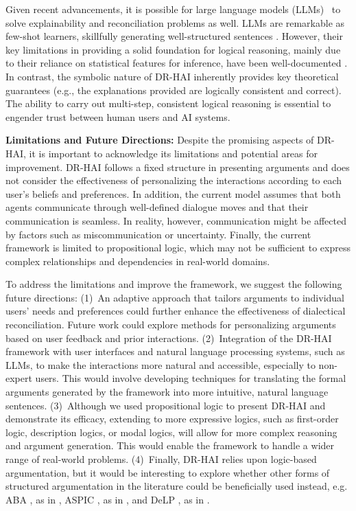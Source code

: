 \documentclass[letterpaper]{article} %
\begin{document}
Given recent advancements, it is possible for large language models (LLMs)~\cite{brown2020language} to solve explainability and reconciliation problems as well. LLMs are remarkable as few-shot learners, skillfully generating well-structured sentences \cite{brown2020language,lu2022pretrained}. However, their key limitations in providing a solid foundation for logical reasoning, mainly due to their reliance on statistical features for inference, have been well-documented \cite{rae2021scaling,creswellselection}. In contrast, the symbolic nature of DR-HAI inherently provides key theoretical guarantees (e.g., the explanations provided are logically consistent and correct). The ability to carry out multi-step, consistent logical reasoning is essential to engender trust between human users and AI systems. %




  \smallskip 
 \noindent \textbf{Limitations and Future Directions: } Despite the promising aspects of DR-HAI, it is important to acknowledge its limitations and potential areas for improvement. 
 DR-HAI follows a fixed structure in presenting arguments and does not consider the effectiveness of personalizing the interactions according to each user's beliefs and preferences. In addition, the current model assumes that both agents communicate through well-defined dialogue moves and that their communication is seamless. In reality, however, communication might be affected by factors such as miscommunication or uncertainty. Finally, the current framework is limited to propositional logic, which may not be sufficient to express complex relationships and dependencies in real-world domains.
 
 To address the limitations and improve the framework, we suggest the following future directions: (1)~An adaptive approach that tailors arguments to individual users' needs and preferences could further enhance the effectiveness of dialectical reconciliation. Future work could explore methods for personalizing arguments based on user feedback and prior interactions. 
 (2)~Integration of the DR-HAI framework with user interfaces and natural language processing systems, such as LLMs, to make the interactions more natural and accessible, especially to non-expert users. This would involve developing techniques for translating the formal arguments generated by the framework into more intuitive, natural language sentences.
 (3)~Although we used propositional logic to present DR-HAI and demonstrate its efficacy, extending to more expressive logics, such as first-order logic,
 description logics, or modal logics, will allow for more complex reasoning and argument generation. This would enable the framework to handle a wider range of real-world problems.
 (4)~Finally, DR-HAI relies upon logic-based argumentation, but it would be interesting to explore whether other forms 
 of structured argumentation in the literature \cite{Arg&CompStruct} could be beneficially used instead, e.g.  ABA \cite{toni2014tutorial}, as in \cite{fan2018on}, ASPIC \cite{modgil2014aspic+}, as in \cite{collins2019towards,oren2020argument}, and DeLP \cite{garcia2014defeasible}, as in \cite{teze22an}. 

\end{document}
